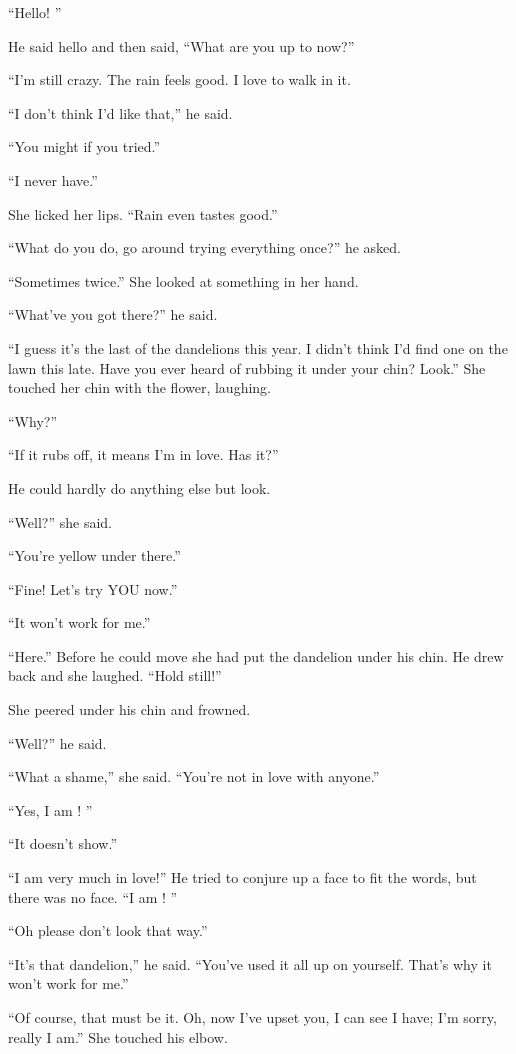 \documentclass[11pt,openany]{book}
\begin{document}
``Hello! ''

He said hello and then said, ``What are you up to now?''

``I'm still crazy. The rain feels good. I love to walk in it.

``I don't think I'd like that,'' he said.

``You might if you tried.''

``I never have.''

She licked her lips. ``Rain even tastes good.''

``What do you do, go around trying everything once?'' he asked.

``Sometimes twice.'' She looked at something in her hand.

``What've you got there?'' he said.

``I guess it's the last of the dandelions this year. I didn't think I'd find one on the lawn this late. Have you ever heard of rubbing it under your chin? Look.'' She touched her chin with the flower, laughing.

``Why?''

``If it rubs off, it means I'm in love. Has it?''

He could hardly do anything else but look.

``Well?'' she said.

``You're yellow under there.''

``Fine! Let's try YOU now.''

``It won't work for me.''

``Here.'' Before he could move she had put the dandelion under his chin. He drew back and she laughed. ``Hold still!''

She peered under his chin and frowned.

``Well?'' he said.

``What a shame,'' she said. ``You're not in love with anyone.''

``Yes, I am ! ''

``It doesn't show.''

``I am very much in love!'' He tried to conjure up a face to fit the words, but there was no face. ``I am ! ''

``Oh please don't look that way.''

``It's that dandelion,'' he said. ``You've used it all up on yourself. That's why it won't work for me.''

``Of course, that must be it. Oh, now I've upset you, I can see I have; I'm sorry, really I am.'' She touched his elbow.
\end{document}
